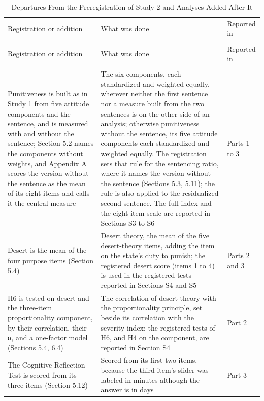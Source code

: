 \begin{longtable}{@{}>{\raggedright\arraybackslash}p{2.483in}>{\raggedright\arraybackslash}p{2.181in}>{\raggedright\arraybackslash}p{1.503in}@{}}
\noalign{\gdef\thetable{S5}}
\caption{Departures From the Preregistration of Study 2 and Analyses Added After It}\label{tab:s5}\\
\toprule
Registration or addition & What was done & Reported in \\
\midrule
\endfirsthead
\multicolumn{3}{@{}l}{\textit{Table S5 (continued)}}\\[4pt]
\toprule
Registration or addition & What was done & Reported in \\
\midrule
\endhead
\multicolumn{3}{@{}l@{}}{\emph{Departures}} \\*
Punitiveness is built as in Study 1 from five attitude components and the sentence, and is measured with and without the sentence; Section 5.2 names the components without weights, and Appendix A scores the version without the sentence as the mean of its eight items and calls it the central measure & The six components, each standardized and weighted equally, wherever neither the first sentence nor a measure built from the two sentences is on the other side of an analysis; otherwise punitiveness without the sentence, its five attitude components each standardized and weighted equally. The registration sets that rule for the sentencing ratio, where it names the version without the sentence (Sections 5.3, 5.11); the rule is also applied to the residualized second sentence. The full index and the eight-item scale are reported in Sections S3 to S6 & Parts 1 to 3 \\
Desert is the mean of the four purpose items (Section 5.4) & Desert theory, the mean of the five desert-theory items, adding the item on the state's duty to punish; the registered desert score (items 1 to 4) is used in the registered tests reported in Sections S4 and S5 & Parts 2 and 3 \\
H6 is tested on desert and the three-item proportionality component, by their correlation, their α, and a one-factor model (Sections 5.4, 6.4) & The correlation of desert theory with the proportionality principle, set beside its correlation with the severity index; the registered tests of H6, and H4 on the component, are reported in Section S4 & Part 2 \\
The Cognitive Reflection Test is scored from its three items (Section 5.12) & Scored from its first two items, because the third item's slider was labeled in minutes although the answer is in days & Part 3 \\

\end{longtable}
